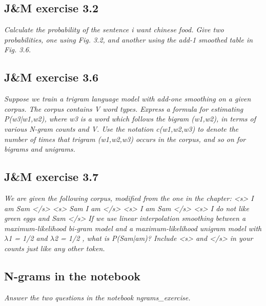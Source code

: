 \documentclass[a4paper, 11pt]{article}
\begin{document}
\subsection{J\&M exercise 3.2}

\textit{Calculate the probability of the sentence i want chinese food. Give two probabilities, one using Fig. 3.2, and another using the add-1 smoothed table in Fig. 3.6.}

\subsection{J\&M exercise 3.6}

\textit{Suppose we train a trigram language model with add-one smoothing on a given corpus. The corpus contains V word types. Express a formula for estimating P(w3|w1,w2), where w3 is a word which follows the bigram (w1,w2), in terms of various N-gram counts and V. Use the notation c(w1,w2,w3) to denote the number of times that trigram (w1,w2,w3) occurs in the corpus, and so on for bigrams and unigrams.}

\subsection{J\&M exercise 3.7}

\textit{We are given the following corpus, modified from the one in the chapter:
<s> I am Sam </s>
<s> Sam I am </s>
<s> I am Sam </s>
<s> I do not  like green eggs and Sam </s>
If we use linear interpolation smoothing between a maximum-likelihood bi-gram model and a maximum-likelihood unigram model with $\lambda$1 = 1/2 and $\lambda$2 = 1/2 , what is P(Sam|am)? Include <s> and </s> in your counts just like any other token.}

\subsection{N-grams in the notebook}

\textit{Answer the two questions in the notebook ngrams\_exercise.}
\end{document}
